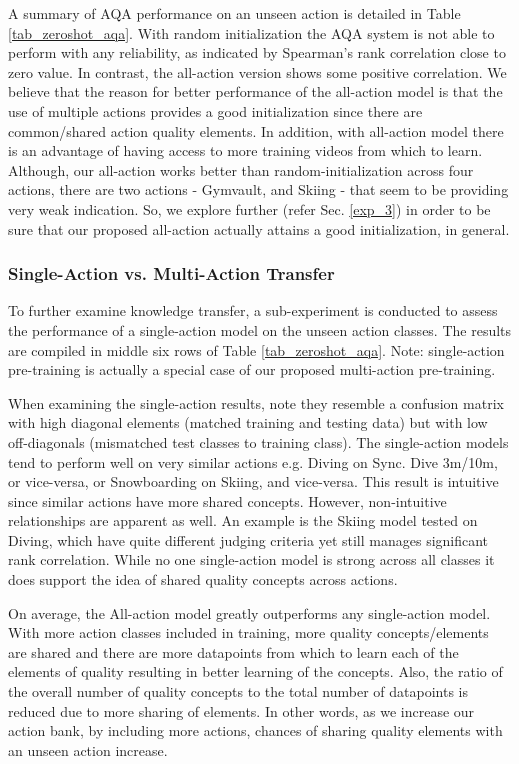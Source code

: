 \documentclass[10pt,twocolumn,letterpaper]{article}
\begin{document}
A summary of AQA performance on an unseen action is detailed in Table \ref{tab_zeroshot_aqa}.  With random initialization the AQA system is not able to perform with any reliability, as indicated by Spearman's rank correlation close to zero value.  In contrast, the all-action version shows some positive correlation. We believe that the reason for better performance of the all-action model is that the use of multiple actions provides a good initialization since there are common/shared action quality elements.  In addition, with all-action model there is an advantage of having access to more training videos from which to learn. Although, our all-action works better than random-initialization across four actions, there are two actions - Gymvault, and Skiing - that seem to be providing very weak indication. So, we explore further (refer Sec. \ref{exp_3}) in order to be sure that our proposed all-action actually attains a good initialization, in general.
\subsubsection{Single-Action vs. Multi-Action Transfer}
To further examine knowledge transfer, a sub-experiment is conducted to assess the performance of a single-action model on the unseen action classes. The results are compiled in middle six rows of Table \ref{tab_zeroshot_aqa}.  Note: single-action pre-training is actually a special case of our proposed multi-action pre-training.

When examining the single-action results, note they resemble a confusion matrix with high diagonal elements (matched training and testing data) but with low off-diagonals (mismatched test classes to training class).  The single-action models tend to perform well on very similar actions e.g. Diving on Sync. Dive 3m/10m, or vice-versa, or Snowboarding on Skiing, and vice-versa.  This result is intuitive since similar actions have more shared concepts.  However, non-intuitive relationships are apparent as well.  An example is the Skiing model tested on Diving, which have quite different judging criteria yet still manages significant rank correlation.  While no one single-action model is strong across all classes it does support the idea of shared quality concepts across actions.

On average, the All-action model greatly outperforms any single-action model. With more action classes included in training, more quality concepts/elements are shared and there are more datapoints from which to learn each of the elements of quality resulting in better learning of the concepts.  Also, the ratio of the overall number of quality concepts to the total number of datapoints is reduced due to more sharing of elements. In other words, as we increase our action bank, by including more actions, chances of sharing quality elements with an unseen action increase. 
\end{document}
